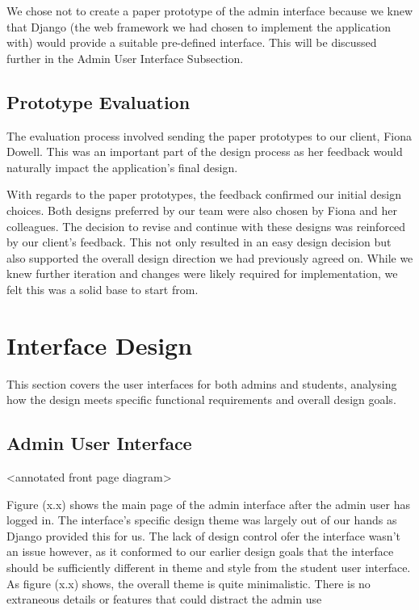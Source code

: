 \documentclass{l3proj}
\begin{document}
We chose not to create a paper prototype of the admin interface because we knew that Django (the web framework we had chosen to implement the application with) would provide a suitable pre-defined interface. This will be discussed further in the Admin User Interface Subsection. 
 
\subsection{Prototype Evaluation}

The evaluation process involved sending the paper prototypes to our client, Fiona Dowell. This was an important part of the design process as her feedback would naturally impact the application's final design. 

With regards to the paper prototypes, the feedback confirmed our initial design choices. Both designs preferred by our team were also chosen by Fiona and her colleagues. The decision to revise and continue with these designs was reinforced by our client's feedback. This not only resulted in an easy design decision but also supported the overall design direction we had previously agreed on. While we knew further iteration and changes were likely required for implementation, we felt this was a solid base to start from.

\section{Interface Design}

This section covers the user interfaces for both admins and students, analysing how the design meets specific functional requirements and overall design goals.

\subsection{Admin User Interface}

<annotated front page diagram>

Figure (x.x) shows the main page of the admin interface after the admin user has logged in. The interface's specific design theme was largely out of our hands as Django provided this for us. The lack of design control ofer the interface wasn't an issue however, as it conformed to our earlier design goals that the interface should be sufficiently different in theme and style from the student user interface. As figure (x.x) shows, the overall theme is quite minimalistic. There is no extraneous details or features that could distract the admin use
\end{document}
